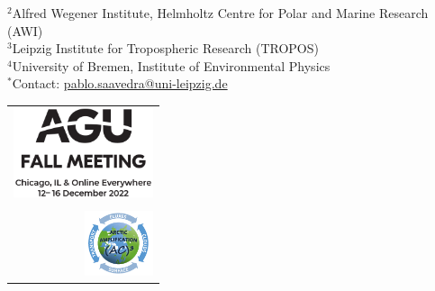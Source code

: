 \documentclass[landscape,a0paper,fontscale=0.45,margin=1cm]{baposter/baposter}
\begin{document}
\begin{poster}
{    $^2$Alfred Wegener Institute, Helmholtz Centre for Polar and Marine Research (AWI)\\
    $^3$Leipzig Institute for Tropospheric Research (TROPOS)\\
    $^4$University of Bremen, Institute of Environmental Physics\\
	$^*$Contact: \url{pablo.saavedra@uni-leipzig.de}
   }
  {%
    \begin{tabular}{r}
   	\includegraphics[height=7.1em]{agu_logo.png}\\
   	\vspace{+10em}\\
    \includegraphics[height=5.1em]{logo_small-ac3.png}
    \end{tabular}   
  }

    \newcommand{\colouredcircle}{%
      \vspace{1em}\tikz{\useasboundingbox (-0.2em,-0.32em) rectangle(0.2em,0.32em); \draw[draw=black,fill=lightblue,line width=0.03em] (0,0) circle(0.28em);}\hspace{0.8em}}


\end{poster}
\end{document}
